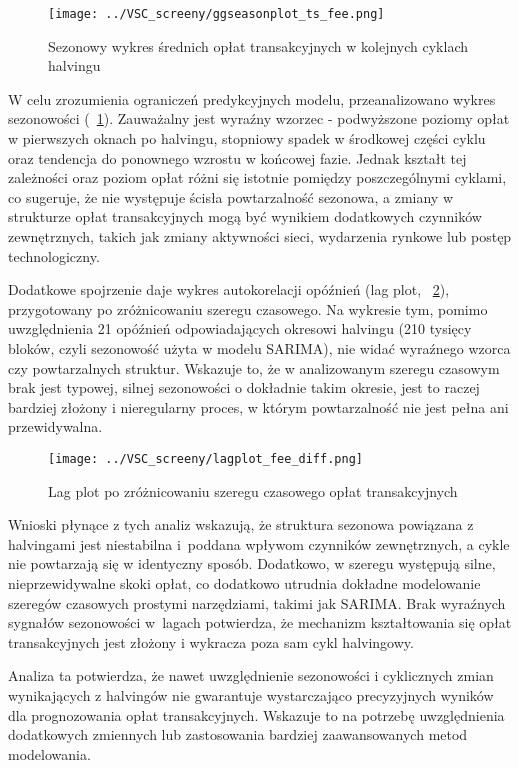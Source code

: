 \documentclass[12pt,a4paper]{report}
\theoremstyle{definition} %
\begin{document}
\begin{figure}[H]
    \centering
    \texttt{[image: ../VSC\_screeny/ggseasonplot\_ts\_fee.png]}
    \caption{Sezonowy wykres średnich opłat transakcyjnych w kolejnych cyklach halvingu}
    \label{fig:ggseasonplot}
\end{figure}

W celu zrozumienia ograniczeń predykcyjnych modelu, przeanalizowano wykres sezonowości (\figurename~\ref{fig:ggseasonplot}). Zauważalny jest wyraźny wzorzec - podwyższone poziomy opłat w pierwszych oknach po halvingu, stopniowy spadek w środkowej części cyklu oraz tendencja do ponownego wzrostu w końcowej fazie. Jednak kształt tej zależności oraz poziom opłat różni się istotnie pomiędzy poszczególnymi cyklami, co sugeruje, że nie występuje ścisła powtarzalność sezonowa, a zmiany w strukturze opłat transakcyjnych mogą być wynikiem dodatkowych czynników zewnętrznych, takich jak zmiany aktywności sieci, wydarzenia rynkowe lub postęp technologiczny.

Dodatkowe spojrzenie daje wykres autokorelacji opóźnień (lag plot, \figurename~\ref{fig:lag_ts_fee}), przygotowany po zróżnicowaniu szeregu czasowego. Na wykresie tym, pomimo uwzględnienia 21 opóźnień odpowiadających okresowi halvingu (210 tysięcy bloków, czyli sezonowość użyta w modelu SARIMA), nie widać wyraźnego wzorca czy powtarzalnych struktur. Wskazuje to, że w analizowanym szeregu czasowym brak jest typowej, silnej sezonowości o dokładnie takim okresie, jest to raczej bardziej złożony i nieregularny proces, w którym powtarzalność nie jest pełna ani przewidywalna.

\begin{figure}[H]
    \centering
    \texttt{[image: ../VSC\_screeny/lagplot\_fee\_diff.png]}
    \caption{Lag plot po zróżnicowaniu szeregu czasowego opłat transakcyjnych}
    \label{fig:lag_ts_fee}
\end{figure}

Wnioski płynące z tych analiz wskazują, że struktura sezonowa powiązana z halvingami jest niestabilna i~poddana wpływom czynników zewnętrznych, a cykle nie powtarzają się w identyczny sposób. Dodatkowo, w szeregu występują silne, nieprzewidywalne skoki opłat, co dodatkowo utrudnia dokładne modelowanie szeregów czasowych prostymi narzędziami, takimi jak SARIMA. Brak wyraźnych sygnałów sezonowości w~lagach potwierdza, że mechanizm kształtowania się opłat transakcyjnych jest złożony i wykracza poza sam cykl halvingowy.

Analiza ta potwierdza, że nawet uwzględnienie sezonowości i cyklicznych zmian wynikających z halvingów nie gwarantuje wystarczająco precyzyjnych wyników dla prognozowania opłat transakcyjnych. Wskazuje to na potrzebę uwzględnienia dodatkowych zmiennych lub zastosowania bardziej zaawansowanych metod modelowania.
\end{document}
